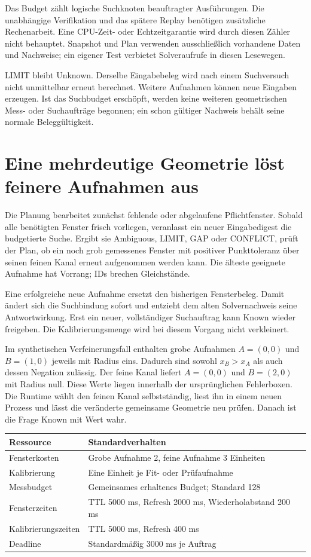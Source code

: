 \documentclass[11pt,a4paper]{article}
\newcommand{\nextsection}[2]{\clearpage{\color{accent}\small\textsf{#1}}\section{#2}}
\begin{document}
Das Budget zählt logische Suchknoten beauftragter Ausführungen.
Die unabhängige Verifikation und das spätere Replay benötigen
zusätzliche Rechenarbeit. Eine CPU-Zeit- oder Echtzeitgarantie
wird durch diesen Zähler nicht behauptet. Snapshot und Plan
verwenden ausschließlich vorhandene Daten und Nachweise;
ein eigener Test verbietet Solveraufrufe in diesen Lesewegen.

LIMIT bleibt Unknown. Derselbe Eingabebeleg wird nach einem
Suchversuch nicht unmittelbar erneut berechnet. Weitere
Aufnahmen können neue Eingaben erzeugen. Ist das Suchbudget
erschöpft, werden keine weiteren geometrischen Mess- oder
Suchaufträge begonnen; ein schon gültiger Nachweis behält
seine normale Beleggültigkeit.

\nextsection{73 / AKTIVE NACHMESSUNG}{Eine mehrdeutige Geometrie löst feinere Aufnahmen aus}
Die Planung bearbeitet zunächst fehlende oder abgelaufene
Pflichtfenster. Sobald alle benötigten Fenster frisch vorliegen,
veranlasst ein neuer Eingabedigest die budgetierte Suche.
Ergibt sie Ambiguous, LIMIT, GAP oder CONFLICT, prüft der Plan,
ob ein noch grob gemessenes Fenster mit positiver Punkttoleranz
über seinen feinen Kanal erneut aufgenommen werden kann.
Die älteste geeignete Aufnahme hat Vorrang; IDs brechen Gleichstände.

Eine erfolgreiche neue Aufnahme ersetzt den bisherigen
Fensterbeleg. Damit ändert sich die Suchbindung sofort und
entzieht dem alten Solvernachweis seine Antwortwirkung.
Erst ein neuer, vollständiger Suchauftrag kann Known wieder
freigeben. Die Kalibrierungsmenge wird bei diesem Vorgang
nicht verkleinert.

Im synthetischen Verfeinerungsfall enthalten grobe Aufnahmen
$A=(0,0)$ und $B=(1,0)$ jeweils mit Radius eins. Dadurch sind
sowohl $x_B>x_A$ als auch dessen Negation zulässig. Der feine
Kanal liefert $A=(0,0)$ und $B=(2,0)$ mit Radius null. Diese
Werte liegen innerhalb der ursprünglichen Fehlerboxen. Die
Runtime wählt den feinen Kanal selbstständig, liest ihn in
einem neuen Prozess und lässt die veränderte gemeinsame
Geometrie neu prüfen. Danach ist die Frage Known mit Wert wahr.

\begin{tabularx}{\linewidth}{@{}lY@{}}\toprule
Ressource & Standardverhalten\\\midrule
Fensterkosten & Grobe Aufnahme 2, feine Aufnahme 3 Einheiten\\
Kalibrierung & Eine Einheit je Fit- oder Prüfaufnahme\\
Messbudget & Gemeinsames erhaltenes Budget; Standard 128\\
Fensterzeiten & TTL 5000 ms, Refresh 2000 ms, Wiederholabstand 200 ms\\
Kalibrierungszeiten & TTL 5000 ms, Refresh 400 ms\\
Deadline & Standardmäßig 3000 ms je Auftrag\\\bottomrule
\end{tabularx}
\end{document}
